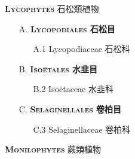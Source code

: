 \noindent \normalsize\textsc{\textbf{Lycophytes} 石松類植物}\selectfont \\
\footnotesize\selectfont
\begin{enumerate}
  \item[A. ] \textbf{\textsc{Lycopodiales} 石松目}   
    \begin{enumerate}
      \item[A.1] Lycopodiaceae 石松科      
        
    \end{enumerate}
  \item[B. ] \textbf{\textsc{Isoëtales} 水韭目}   
    \begin{enumerate}
      \item[B.2] Isoëtaceae 水韭科      
        
    \end{enumerate}
  \item[C. ] \textbf{\textsc{Selaginellales} 卷柏目}   
    \begin{enumerate}
      \item[C.3] Selaginellaceae 卷柏科      
        
    \end{enumerate}
\end{enumerate}
\vspace{2ex} 
\noindent \normalsize\textsc{\textbf{Monilophytes} 蕨類植物}\selectfont \\
\footnotesize\selectfont
